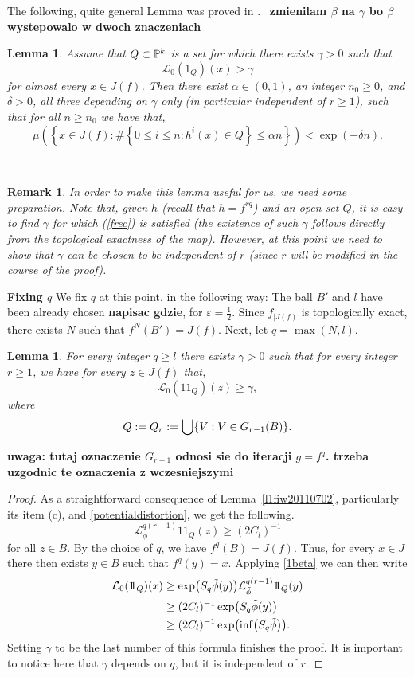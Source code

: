 \documentclass[12pt]{amsart}
\numberwithin{equation}{section}
\newcommand{\beq}{\begin{equation}}
\newcommand{\eeq}{\end{equation}}
\newcommand{\blem}{\begin{lem}}
\newcommand{\elem}{\end{lem}}
\newtheorem{lem}[thm]{Lemma}
\newtheorem{rem}[thm]{Remark}
\def\1{1\!\!1}
\def\L{{\mathcal L}}           \def\M{\mathcal M}        \def\Pa{{\mathcal P}}
\def\({\bigl(}                \def\){\bigr)}
\def\lt{\left}                \def\rt{\right}
\def\sbt{\subset}             \def\spt{\supset}
\begin{document}
The following, quite general Lemma was proved in \cite{uzpk}.
\
{\bf zmienilam $\beta$ na $\gamma$ bo $\beta$ wystepowalo w dwoch znaczeniach}

\begin{lem}\label{czest}
Assume that $Q\sbt\Pk$ is a set for which there exists $\gamma>0$ such that 
\begin{equation}\label{frec}
\mathcal{L}_0(1_{Q})(x)>\gamma
\end{equation}
for almost every $x\in J(f)$.
Then there exist $\alpha\in (0,1)$, an integer $n_0\ge 0$, and
$\delta>0$, all three depending on $\gamma$ only (in particular
independent of $r\ge 1$), such that for all $n\ge n_0$ we have that,
\begin{equation}
\mu\lt(\lt\{x\in J(f):\#\left\{0\le i\le n: h^i(x)\in Q\right\} 
\le\alpha n\rt\}\rt)
<\exp(-\delta n).
\end{equation}
\end{lem}

\
\begin{rem}
\fr In order to make this lemma useful for us, we need some  preparation. Note that, given $h$ (recall that $h=f^{rq}$) and an open set $Q$, it is easy to find $\gamma$ for which (\ref{frec}) is satisfied (the existence of such $\gamma$ follows directly from the topological exactness of the map). However, at this point we need to show that $\gamma$ can be chosen to be independent of $r$ (since $r$ will be modified in the course of the proof).
\end{rem}


{\bf Fixing $q$}
We fix $q$ at this point, in the following way: The ball $B'$ and $l$ have been already chosen {\bf napisac gdzie}, for $\varepsilon=\frac{1}{2}$.
Since $f_{|J(f)}$ is topologically exact, there exists $N$ such that $f^N(B')=J(f)$. Next, let $q=\max (N,l)$. 



\blem\label{l520110702}
For every integer $q\ge l$  there exists $\gamma>0$ such that
for every integer $r\ge 1$, we have for every $z\in J(f)$ that,
$$
\L_0(\1_Q)(z)\ge \gamma,
$$
where 
$$
Q:=Q_r:=\bigcup\{V:V\in G_{r-1}(B)\}.
$$
\elem
{\bf uwaga: tutaj oznaczenie $G_{r-1}$ odnosi sie do iteracji $g=f^q$. trzeba uzgodnic te oznaczenia z wczesniejszymi}



\begin{proof}
As a straightforward consequence of Lemma~\ref{l1fiw20110702},
particularly its item (c), and \eqref{potentialdistortion}, we get the
following.
\beq\label{1beta}
\L_\phi^{q(r-1)}\1_Q(z)\ge (2C_l)^{-1}
\eeq
for all $z\in B$. By the choice of $q$, we have  $f^q(B)=J(f)$. Thus, for
every $x\in J$ there then exists $y\in B$ such that
$f^q(y)=x$. Applying \eqref{1beta} we can then write
$$
\aligned
\L_0(\1_Q)(x)
&\ge \exp\(S_q\tilde\phi(y)\)\L_{\tilde\phi}^{q(r-1)}\1_Q(y) \\
&\ge (2C_l)^{-1}\exp\(S_q\tilde\phi(y)\) \\
&\ge (2C_l)^{-1}\exp\(\inf\(S_q\tilde\phi\)\).
\endaligned
$$
Setting $\gamma$ to be the last number of this formula finishes the proof. It is important to notice here  that $\gamma$ depends on $q$, but it is independent of $r$.
\end{proof}
\end{document}
